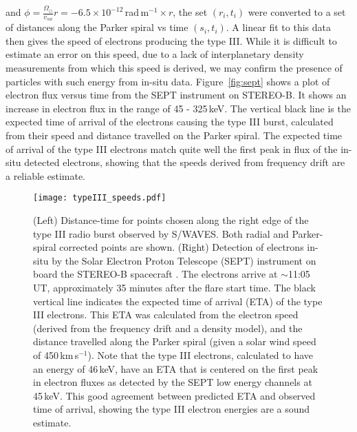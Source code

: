and $\phi=\frac{ \Omega_{\odot}}{v_{sw}}r=-6.5\times10^{-12}$\,rad\,m$^{-1}\times r$, the set $(r_i,t_i)$ were converted to a set of distances along the Parker spiral vs time $(s_i, t_i)$. A linear fit to this data then gives the speed of electrons producing the type III. While it is difficult to estimate an error on this speed, due to a lack of interplanetary density measurements from which this speed is derived, we may confirm the presence of particles with such energy from in-situ data. Figure~\ref{fig:sept} shows a plot of electron flux versus time from the SEPT instrument on STEREO-B. It shows an increase in electron flux in the range of 45 - 325\,keV. The vertical black line is the expected time of arrival of the electrons causing the type III burst, calculated from their speed and distance travelled on the Parker spiral. The expected time of arrival of the type III electrons match quite well the first peak in flux of the in-situ detected electrons, showing that the speeds derived from frequency drift are a reliable estimate.

\begin{figure}[!t]
\begin{center}
\texttt{[image: typeIII\_speeds.pdf]}
\caption[Type III speeds]{(Left) Distance-time for points chosen along the right edge of the type III radio burst observed by S/WAVES. Both radial and Parker-spiral corrected points are shown. (Right) Detection of electrons in-situ by the Solar Electron Proton Telescope (SEPT)\citep{muller2008} instrument on board the STEREO-B spacecraft \citep{kai08}. The electrons arrive at $\sim$11:05\,UT, approximately 35 minutes after the flare start time. The black vertical line indicates the expected time of arrival (ETA) of the type III electrons. This ETA was calculated from the electron speed (derived from the frequency drift and a density model), and the distance travelled along the Parker spiral (given a solar wind speed of 450\,km\,s$^{-1}$). Note that the type III electrons, calculated to have an energy of 46\,keV, have an ETA that is centered on the first peak in electron fluxes as detected by the SEPT low energy channels at 45\,keV. This good agreement between predicted ETA and observed time of arrival, showing the type III electron energies are a sound estimate.}
\label{fig:typeIII_speeds}
\end{center}
\end{figure}

